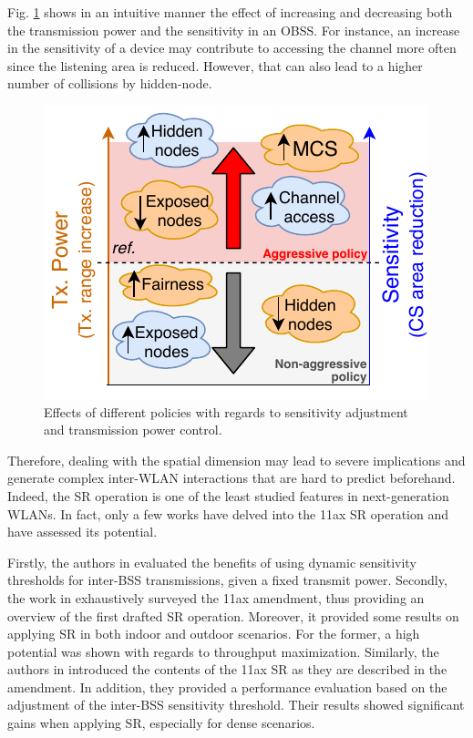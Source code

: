 \documentclass[comsoc]{IEEEtran}
\begin{document}
	Fig. \ref{fig:policies_sr} shows in an intuitive manner the effect of increasing and decreasing both the transmission power and the sensitivity in an OBSS. For instance, an increase in the sensitivity of a device may contribute to accessing the channel more often since the listening area is reduced. However, that can also lead to a higher number of collisions by hidden-node.
	\begin{figure}[ht!]
		\centering
		\includegraphics[width=0.8\columnwidth]{policies_sr}
		\caption{Effects of different policies with regards to sensitivity adjustment and transmission power control.}
		\label{fig:policies_sr}
	\end{figure}
	
	Therefore, dealing with the spatial dimension may lead to severe implications and generate complex inter-WLAN interactions that are hard to predict beforehand. Indeed, the SR operation is one of the least studied features in next-generation WLANs. In fact, only a few works have delved into the 11ax SR operation and have assessed its potential. 
	
	Firstly, the authors in \cite{mori2014performance} evaluated the benefits of using dynamic sensitivity thresholds for inter-BSS transmissions, given a fixed transmit power. Secondly, the work in \cite{qu2018survey} exhaustively surveyed the 11ax amendment, thus providing an overview of the first drafted SR operation. Moreover, it provided some results on applying SR in both indoor and outdoor scenarios. For the former, a high potential was shown with regards to throughput maximization. Similarly, the authors in \cite{shen2018research} introduced the contents of the 11ax SR as they are described in the amendment. In addition, they provided a performance evaluation based on the adjustment of the inter-BSS sensitivity threshold. Their results showed significant gains when applying SR, especially for dense scenarios. 
\end{document}
